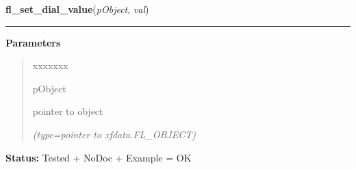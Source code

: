     \label{xformslib:library:fl_set_dial_value}

    \vspace{0.5ex}

\hspace{.8\funcindent}\begin{boxedminipage}{\funcwidth}

    \raggedright \textbf{fl\_set\_dial\_value}(\textit{pObject}, \textit{val})

    \vspace{-1.5ex}

    \rule{\textwidth}{0.5\fboxrule}
\setlength{\parskip}{2ex}
\setlength{\parskip}{1ex}
      \textbf{Parameters}
      \vspace{-1ex}

      \begin{quote}
        \begin{Ventry}{xxxxxxx}

          \item[pObject]

          pointer to object

            {\it (type=pointer to xfdata.FL\_OBJECT)}

        \end{Ventry}

      \end{quote}

\textbf{Status:} Tested + NoDoc + Example = OK



    \end{boxedminipage}

    \label{xformslib:library:fl_get_dial_value}

    \vspace{0.5ex}

